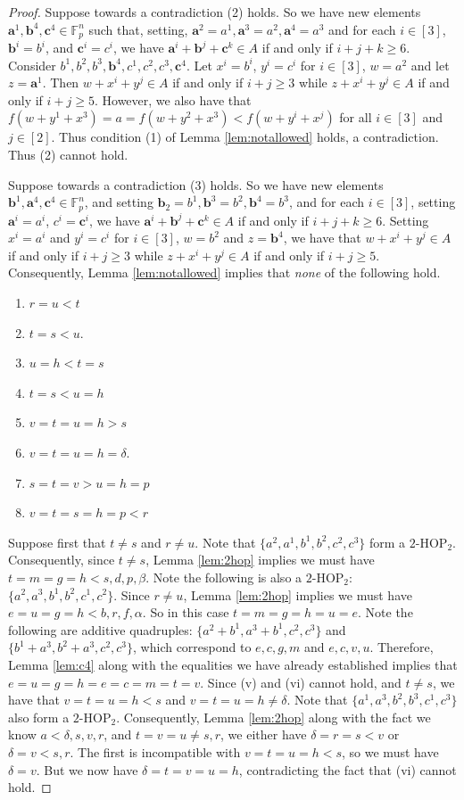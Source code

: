 \documentclass[12pt,oneside,british,a4wide]{amsart}
\numberwithin{equation}{section}
\theoremstyle{definition}
\def\F{\mathbb{F}}
\def\HOP{\mathrm{HOP}}
\begin{document}
\begin{proof}
Suppose towards a contradiction (2) holds.  So we have new elements $\mathbf{a}^1,\mathbf{b}^4,\mathbf{c}^4\in \F_p^n$ such that, setting, $\mathbf{a}^2=a^1,\mathbf{a}^3=a^2, \mathbf{a}^4=a^3$ and for each $i\in [3]$, $\mathbf{b}^i=b^i$, and $\mathbf{c}^i=c^i$, we have $\mathbf{a}^i+\mathbf{b}^j+\mathbf{c}^k\in A$ if and only if $i+j+k\geq 6$.  Consider $b^1,b^2,b^3,\mathbf{b}^4, c^1,c^2,c^3, \mathbf{c}^4$.  Let $x^i=b^i$, $y^i=c^i$ for $i\in [3]$, $w=a^2$ and let $z=\mathbf{a}^1$.  Then $w+x^i+y^j\in A$ if and only if $i+j\geq 3$ while $z+x^i+y^j\in A$ if and only if $i+j\geq 5$.  However, we also have that $f(w+y^1+x^3)=a=f(w+y^2+x^3)< f(w+y^i+x^j)$ for all $i\in [3]$ and $j\in [2]$.  Thus condition (1) of Lemma \ref{lem:notallowed} holds, a contradiction.  Thus (2) cannot hold.

Suppose towards a contradiction (3) holds.  So we have new elements  $\mathbf{b}^1,\mathbf{a}^4,\mathbf{c}^4\in \F_p^n$, and setting $\mathbf{b}_2=b^1,\mathbf{b}^3=b^2, \mathbf{b}^4=b^3$, and for each $i\in [3]$, setting  $\mathbf{a}^i=a^i$, $c^i=\mathbf{c}^i$, we have $\mathbf{a}^i+\mathbf{b}^j+\mathbf{c}^k\in A$ if and only if $i+j+k\geq 6$.   Setting $x^i=a^i$ and $y^i=c^i$ for $i\in [3]$, $w=b^2$ and $z=\mathbf{b}^4$, we have that $w+x^i+y^j\in A$ if and only if $i+j\geq 3$ while $z+x^i+y^j\in A$ if and only if $i+j\geq 5$.  Consequently, Lemma \ref{lem:notallowed} implies that \emph{none} of the following hold. 

\begin{enumerate}
\item $r=u<t$
\item $t=s<u$.
\item $u=h<t=s$
\item $t=s<u=h$
\item $v=t=u=h>s$
\item $v=t=u=h=\delta$.
\item $s=t=v>u=h=p$
\item $v=t=s=h=p<r$
\end{enumerate}

Suppose first that $t\neq s$ and $r\neq u$.  Note that $\{a^2,a^1,b^1,b^2,c^2,c^3\}$ form a $2$-$\HOP_2$. Consequently, since $t\neq s$, Lemma \ref{lem:2hop} implies we must have $t=m=g=h<s,d,p,\beta$.  Note the following is also a $2$-$\HOP_2$: $\{a^2,a^3,b^1,b^2,c^1,c^2\}$. Since $r\neq u$, Lemma \ref{lem:2hop} implies we must have $e=u=g=h<b,r,f,\alpha$.  So in this case $t=m=g=h=u=e$. Note the following are additive quadruples: $\{a^2+b^1,a^3+b^1, c^2,c^3\}$ and $\{ b^1+a^3,b^2+a^3, c^2,c^3\}$, which correspond to $e,c,g,m$ and $e,c,v,u$.  Therefore, Lemma \ref{lem:c4} along with the equalities we have already established implies that $e=u=g=h=e=c=m=t=v$.  Since (v) and (vi) cannot hold, and $t\neq s$, we have that $v=t=u=h<s$ and $v=t=u=h\neq \delta$.  Note that $\{a^1,a^3,b^2,b^3,c^1,c^3\}$ also form a $2$-$\HOP_2$.  Consequently, Lemma \ref{lem:2hop} along with the fact we know $a<\delta,s,v,r$, and $t=v=u\neq s,r$, we either have $\delta=r=s<v$ or $\delta=v<s,r$.  The first is incompatible with  $v=t=u=h<s$, so we must have $\delta=v$.  But we now have $\delta=t=v=u=h$, contradicting the fact that (vi) cannot hold.



\end{proof}
\end{document}
